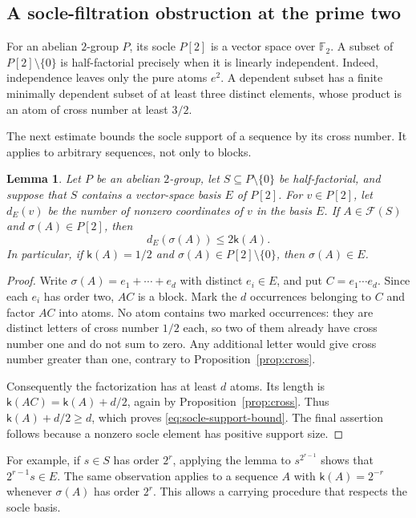 \documentclass[11pt,reqno]{amsart}
\numberwithin{equation}{section}
\newtheorem{lemma}[theorem]{Lemma}
\theoremstyle{definition}
\theoremstyle{remark}
\newcommand{\F}{\mathcal F}
\begin{document}
\subsection{A socle-filtration obstruction at the prime two}

For an abelian $2$-group $P$, its socle $P[2]$ is a vector space
over $\mathbb F_2$. A subset of $P[2]\setminus\{0\}$ is
half-factorial precisely when it is linearly independent. Indeed,
independence leaves only the pure atoms $e^2$. A dependent subset
has a finite minimally dependent subset of at least three distinct
elements, whose product is an atom of cross number at least $3/2$.

The next estimate bounds the socle support of a sequence by its
cross number. It applies to arbitrary sequences, not only to blocks.

\begin{lemma}\label{lem:socle-support}
Let $P$ be an abelian $2$-group, let $S\subseteq P\setminus\{0\}$
be half-factorial, and suppose that $S$ contains a vector-space
basis $E$ of $P[2]$. For $v\in P[2]$, let $d_E(v)$ be the number
of nonzero coordinates of $v$ in the basis $E$. If
$A\in\F(S)$ and $\sigma(A)\in P[2]$, then
\begin{equation}\label{eq:socle-support-bound}
 d_E(\sigma(A))\le 2\mathsf k(A).
\end{equation}
In particular, if $\mathsf k(A)=1/2$ and
$\sigma(A)\in P[2]\setminus\{0\}$, then $\sigma(A)\in E$.
\end{lemma}

\begin{proof}
Write $\sigma(A)=e_1+\cdots+e_d$ with distinct $e_i\in E$,
and put $C=e_1\cdots e_d$. Since each $e_i$ has order two,
$AC$ is a block. Mark the $d$ occurrences belonging to $C$ and
factor $AC$ into atoms. No atom contains two marked occurrences:
they are distinct letters of cross number $1/2$ each, so two of
them already have cross number one and do not sum to zero. Any
additional letter would give cross number greater than one,
contrary to Proposition~\ref{prop:cross}.

Consequently the factorization has at least $d$ atoms. Its length
is $\mathsf k(AC)=\mathsf k(A)+d/2$, again by
Proposition~\ref{prop:cross}. Thus $\mathsf k(A)+d/2\ge d$,
which proves \eqref{eq:socle-support-bound}. The final assertion
follows because a nonzero socle element has positive support size.
\end{proof}

For example, if $s\in S$ has order $2^r$, applying the lemma to
$s^{2^{r-1}}$ shows that $2^{r-1}s\in E$. The same observation
applies to a sequence $A$ with $\mathsf k(A)=2^{-r}$ whenever
$\sigma(A)$ has order $2^r$. This allows a carrying procedure
that respects the socle basis.
\end{document}
